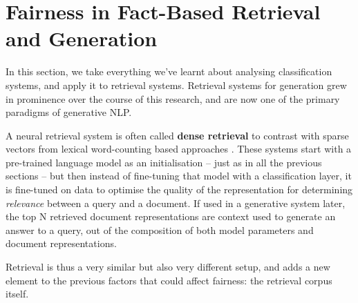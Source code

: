 \part{Fairness in Fact-Based Retrieval and Generation}
\label{part:generation}

In this section, we take everything we've learnt about analysing classification systems, and apply it to retrieval systems. 
Retrieval systems for generation grew in prominence over the course of this research, and are now one of the primary paradigms of generative NLP. 

A neural retrieval system is often called \textbf{dense retrieval} to contrast with sparse vectors from lexical word-counting based approaches \citep{BM25}. These systems start with a pre-trained language model as an initialisation -- just as in all the previous sections -- but then instead of fine-tuning that model with a classification layer, it is fine-tuned on data to optimise the quality of the representation for determining \textit{relevance} between a query and a document. If used in a generative system later, the top N retrieved document representations are context used to generate an answer to a query, out of the composition of both model parameters and document representations. 

Retrieval is thus a very similar but also very different setup, and adds a new element to the previous factors that could affect fairness: the retrieval corpus itself. 



